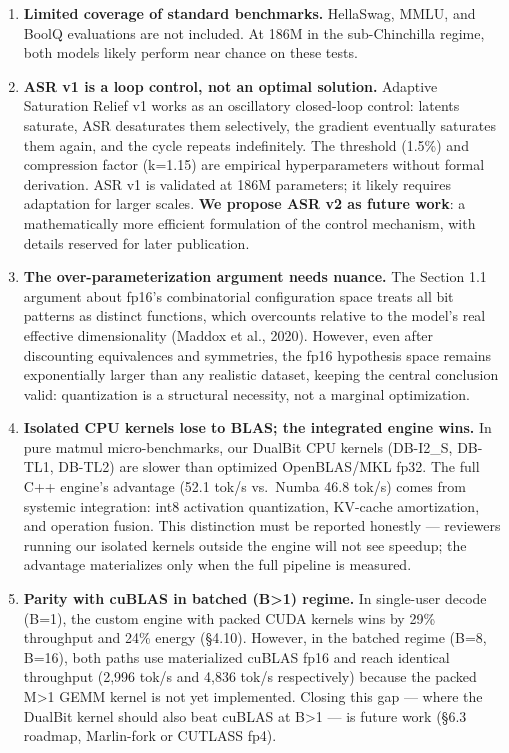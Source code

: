 \begin{enumerate}
  future work.
\item
  \textbf{Limited coverage of standard benchmarks.} HellaSwag, MMLU, and
  BoolQ evaluations are not included. At 186M in the sub-Chinchilla
  regime, both models likely perform near chance on these tests.
\item
  \textbf{ASR v1 is a loop control, not an optimal solution.} Adaptive
  Saturation Relief v1 works as an oscillatory closed-loop control:
  latents saturate, ASR desaturates them selectively, the gradient
  eventually saturates them again, and the cycle repeats indefinitely.
  The threshold (1.5\%) and compression factor (k=1.15) are empirical
  hyperparameters without formal derivation. ASR v1 is validated at 186M
  parameters; it likely requires adaptation for larger scales.
  \textbf{We propose ASR v2 as future work}: a mathematically more
  efficient formulation of the control mechanism, with details reserved
  for later publication.
\item
  \textbf{The over-parameterization argument needs nuance.} The Section
  1.1 argument about fp16's combinatorial configuration space treats all
  bit patterns as distinct functions, which overcounts relative to the
  model's real effective dimensionality (Maddox et al., 2020). However,
  even after discounting equivalences and symmetries, the fp16
  hypothesis space remains exponentially larger than any realistic
  dataset, keeping the central conclusion valid: quantization is a
  structural necessity, not a marginal optimization.
\item
  \textbf{Isolated CPU kernels lose to BLAS; the integrated engine
  wins.} In pure matmul micro-benchmarks, our DualBit CPU kernels
  (DB-I2\_S, DB-TL1, DB-TL2) are slower than optimized OpenBLAS/MKL
  fp32. The full C++ engine's advantage (52.1 tok/s vs.~Numba 46.8
  tok/s) comes from systemic integration: int8 activation quantization,
  KV-cache amortization, and operation fusion. This distinction must be
  reported honestly --- reviewers running our isolated kernels outside
  the engine will not see speedup; the advantage materializes only when
  the full pipeline is measured.
\item
  \textbf{Parity with cuBLAS in batched (B\textgreater1) regime.} In
  single-user decode (B=1), the custom engine with packed CUDA kernels
  wins by 29\% throughput and 24\% energy (§4.10). However, in the
  batched regime (B=8, B=16), both paths use materialized cuBLAS fp16
  and reach identical throughput (2,996 tok/s and 4,836 tok/s
  respectively) because the packed M\textgreater1 GEMM kernel is not yet
  implemented. Closing this gap --- where the DualBit kernel should also
  beat cuBLAS at B\textgreater1 --- is future work (§6.3 roadmap,
  Marlin-fork or CUTLASS fp4).
\end{enumerate}

